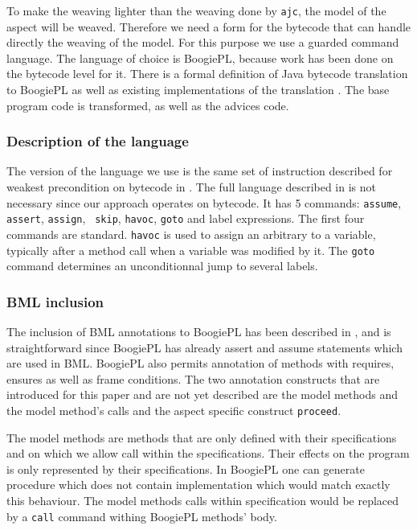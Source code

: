 To make the weaving lighter than the weaving done by {\tt ajc}, 
the model of the aspect  will be weaved. Therefore we need a form
for the bytecode that can handle directly the weaving of the model.
For this purpose we use a guarded command language. The language of 
choice is BoogiePL, because work has been done on the bytecode level for it.
There is a formal definition of Java bytecode translation to BoogiePL 
\cite{LehnerM07} as well as existing implementations of the translation
\cite{javatrans07,coqtrans06}. The base program code is transformed, as well
as the advices code.

\vspace{-0.4cm}
\subsubsection{Description of the language} 
The version of the language we use is the same set of instruction
described for weakest precondition on bytecode in \cite{BarnettL05}.
The full language described in \cite{DeLineL05} is not necessary
since our approach operates on bytecode.
It has 5 commands: {\tt assume}, {\tt assert}, {\tt assign}, {\tt
skip}, {\tt havoc}, {\tt goto} and label expressions.  The first four
commands are standard. {\tt havoc} is used to assign an arbitrary to a
variable, typically after a method call when a variable was modified
by it.  The {\tt goto} command determines an unconditionnal jump to
several labels.

\vspace{-0.4cm}
\subsubsection{BML inclusion}
The inclusion of BML annotations to BoogiePL has been described in 
\cite{javatrans07}, and is straightforward since BoogiePL has already 
assert and assume statements which are used in BML.  BoogiePL also
permits annotation of methods with requires, ensures as well as frame
conditions.  The two annotation constructs that are introduced for
this paper and are not yet described are the model methods and the
model method's calls and the aspect specific construct {\tt proceed}.

The model methods are methods that are only defined with their
specifications and on which we allow call within the
specifications. Their effects on the program is only represented by
their specifications. In BoogiePL one can generate procedure which 
does not contain implementation which would match exactly this behaviour.
The model methods calls within specification would be replaced by a
{\tt call} command withing BoogiePL methods' body.

